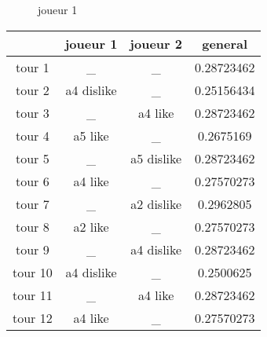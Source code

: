 \documentclass{article}
\begin{document}
\begin{figure}
\centering
{}
\caption{joueur 1}
\end{figure}
\begin{tabular}{|c|c|c|c|}
\hline
& joueur 1 & joueur 2 & general \\
\hline
tour 1 & \_ & \_ & 0.28723462 \\
\hline
tour 2 & a4 dislike & \_ & 0.25156434 \\
\hline
tour 3 & \_ & a4 like & 0.28723462 \\
\hline
tour 4 & a5 like & \_ & 0.2675169 \\
\hline
tour 5 & \_ & a5 dislike & 0.28723462 \\
\hline
tour 6 & a4 like & \_ & 0.27570273 \\
\hline
tour 7 & \_ & a2 dislike & 0.2962805 \\
\hline
tour 8 & a2 like & \_ & 0.27570273 \\
\hline
tour 9 & \_ & a4 dislike & 0.28723462 \\
\hline
tour 10 & a4 dislike & \_ & 0.2500625 \\
\hline
tour 11 & \_ & a4 like & 0.28723462 \\
\hline
tour 12 & a4 like & \_ & 0.27570273 \\
\hline
\end{tabular}
\end{document}
